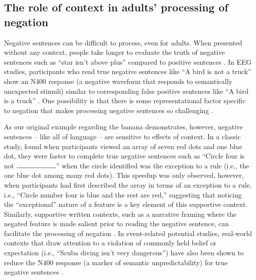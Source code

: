\documentclass[man, noapacite]{apa2}
\begin{document}
\subsection{The role of context in adults' processing of negation}

Negative sentences can be difficult to process, even for adults. When presented without any context, people take longer to evaluate the truth of negative sentences such as ``star isn't above plus'' compared to positive sentences \cite{hclark1972, carpenter1975, just1971, just1976}. In EEG studies, participants who read true negative sentences like ``A bird is not a truck'' show an N400 response (a negative waveform that responds to semantically unexpected stimuli) similar to corresponding false positive sentences like ``A bird is a truck'' \cite{fischler1983, ludtke2008}. One possibility is that there is some representational factor specific to negation that makes processing negative sentences so challenging \cite{hclark1972}.

As our original example regarding the banana demonstrates, however, negative sentences -- like all of language -- are sensitive to effects of context. In a classic study,  found when participants viewed an array of seven red dots and one blue dot, they were faster to complete true negative sentences such as ``Circle four is not $\rule{2cm}{0.15mm}$'' when the circle identified was the exception to a rule (i.e., the one blue dot among many red dots). This speedup was only observed, however, when participants had first described the array in terms of an exception to a rule, i.e., ``Circle number four is blue and the rest are red,'' suggesting that noticing the ``exceptional'' nature of a feature is a key element of this supportive context. Similarly, supportive written contexts, such as a narrative framing where the negated feature is made salient prior to reading the negative sentence, can facilitate the processing of negation \cite{glenberg1999, ludtke2006, nieuwland2008, dale2011}. In event-related potential studies, real-world contexts that draw attention to a violation of commonly held belief or expectation (i.e., ``Scuba diving isn't very dangerous'') have also been shown to reduce the N400 response (a marker of semantic unpredictability) for true negative sentences \cite{nieuwland2008}.
\end{document}

